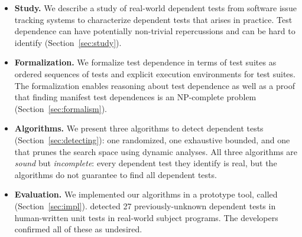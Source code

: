 \begin{itemize}

  \item \textbf{Study.} We describe a study of \dtnum real-world
  dependent tests from \repnum software issue tracking
  systems to characterize dependent tests that
  arises in practice.  Test dependence can have
  potentially non-trivial repercussions and can be hard to identify
  (Section~\ref{sec:study}).

\item \textbf{Formalization.} We formalize test dependence
  in terms of test suites as ordered sequences of tests and explicit execution
  environments for test suites.  The formalization enables reasoning about test dependence
  as well as a proof that finding manifest test dependences is an NP-complete
  problem (Section~\ref{sec:formalism}).

  \item \textbf{Algorithms.} We present three algorithms
  to detect dependent tests (Section~\ref{sec:detecting}):
  one randomized, one exhaustive bounded, and one that prunes the search
  space using dynamic analyses.
  All three algorithms are \emph{sound} but \emph{incomplete}:
  every dependent test they identify is real, but the algorithms
  do not guarantee to find all dependent tests. 

  \item \textbf{Evaluation.} We implemented our algorithms in a prototype
  tool, called \ourtool (Section~\ref{sec:impl}).
  \ourtool detected 27 previously-unknown dependent tests in human-written
  unit tests in \subjnum real-world subject programs.
  The developers confirmed all of these as
  undesired.

\end{itemize}



